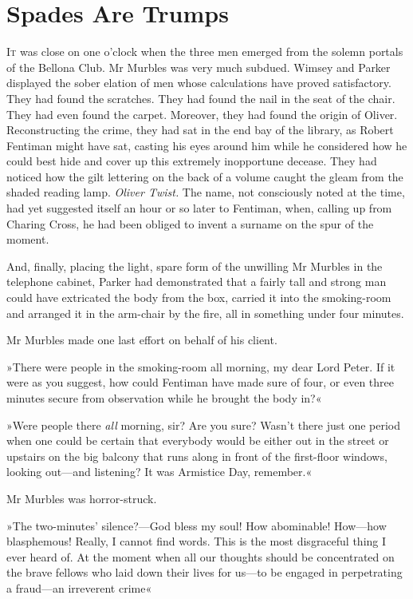 \chapter{Spades Are Trumps}
\lettrine[lines=4]{I}{t} was close on one o'clock when the three men emerged from the solemn portals of the Bellona Club. Mr Murbles was very much subdued. Wimsey and Parker displayed the sober elation of men whose calculations have proved satisfactory. They had found the scratches. They had found the nail in the seat of the chair. They had even found the carpet. Moreover, they had found the origin of Oliver. Reconstructing the crime, they had sat in the end bay of the library, as Robert Fentiman might have sat, casting his eyes around him while he considered how he could best hide and cover up this extremely inopportune decease. They had noticed how the gilt lettering on the back of a volume caught the gleam from the shaded reading lamp. \textit{Oliver Twist.} The name, not consciously noted at the time, had yet suggested itself an hour or so later to Fentiman, when, calling up from Charing Cross, he had been obliged to invent a surname on the spur of the moment.

And, finally, placing the light, spare form of the unwilling Mr Murbles in the telephone cabinet, Parker had demonstrated that a fairly tall and strong man could have extricated the body from the box, carried it into the smoking-room and arranged it in the arm-chair by the fire, all in something under four minutes.

Mr Murbles made one last effort on behalf of his client.

»There were people in the smoking-room all morning, my dear Lord Peter. If it were as you suggest, how could Fentiman have made sure of four, or even three minutes secure from observation while he brought the body in?«

»Were people there \textit{all} morning, sir? Are you sure? Wasn't there just one period when one could be certain that everybody would be either out in the street or upstairs on the big balcony that runs along in front of the first-floor windows, looking out\allowbreak---\allowbreak and listening? It was Armistice Day, remember.«

Mr Murbles was horror-struck.

»The two-minutes' silence?---God bless my soul! How abominable! How\allowbreak---\allowbreak how blasphemous! Really, I cannot find words. This is the most disgraceful thing I ever heard of. At the moment when all our thoughts should be concentrated on the brave fellows who laid down their lives for us\allowbreak---\allowbreak to be engaged in perpetrating a fraud\allowbreak---\allowbreak an irreverent crime\longdash«

